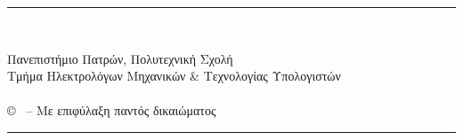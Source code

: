 \pagestyle{empty}

\vspace*{\fill}
\noindent \hspace{2cm} \rule{12.7cm}{0.4pt}\\
\vspace{-1.7em}
\begin{flushleft}
	\hspace*{30mm}Πανεπιστήμιο Πατρών, Πολυτεχνική Σχολή\\
	\hspace*{30mm}Τμήμα Ηλεκτρολόγων Μηχανικών \& Τεχνολογίας Υπολογιστών\\
	\hspace*{30mm}{\nomme}\\
	\hspace*{30mm}© \monthyear \ -- Με επιφύλαξη παντός δικαιώματος\\
\end{flushleft}
\vspace{-1.2em}
\noindent \hspace{2cm} \rule{12.7cm}{0.4pt}
